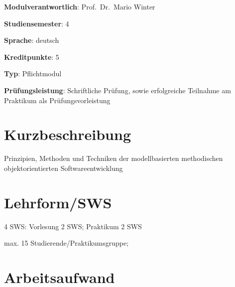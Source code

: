 \begin{modulHead}
\textbf{Modulverantwortlich}: Prof.~Dr.~Mario
Winter
\end{modulHead}
\begin{modulHead}
\textbf{Studiensemester}:
4
\end{modulHead}
\begin{modulHead}
\textbf{Sprache}:
deutsch
\end{modulHead}
\begin{modulHead}
\textbf{Kreditpunkte}:
5
\end{modulHead}
\begin{modulHead}
\textbf{Typ}:
Pflichtmodul
\end{modulHead}
\begin{modulHead}
\textbf{Prüfungsleistung}:
Schriftliche Prüfung, sowie erfolgreiche Teilnahme am Praktikum als
Prüfungsvorleistung
\end{modulHead}


\hypertarget{kurzbeschreibungpathlabelmi-2017modulbeschreibungen-bachelorba_softwaretechnik}{%
\section*{Kurzbeschreibung\label{/mi-2017/modulbeschreibungen-bachelor/BA_Softwaretechnik}}\label{kurzbeschreibungpathlabelmi-2017modulbeschreibungen-bachelorba_softwaretechnik}}

Prinzipien, Methoden und Techniken der modellbasierten methodischen
objektorientierten Softwareentwicklung

\hypertarget{lehrformswspathlabelmi-2017modulbeschreibungen-bachelorba_softwaretechnik}{%
\section*{Lehrform/SWS\label{/mi-2017/modulbeschreibungen-bachelor/BA_Softwaretechnik}}\label{lehrformswspathlabelmi-2017modulbeschreibungen-bachelorba_softwaretechnik}}

4 SWS: Vorlesung 2 SWS; Praktikum 2 SWS

max. 15 Studierende/Praktikumsgruppe;

\hypertarget{arbeitsaufwandpathlabelmi-2017modulbeschreibungen-bachelorba_softwaretechnik}{%
\section*{Arbeitsaufwand\label{/mi-2017/modulbeschreibungen-bachelor/BA_Softwaretechnik}}\label{arbeitsaufwandpathlabelmi-2017modulbeschreibungen-bachelorba_softwaretechnik}}

